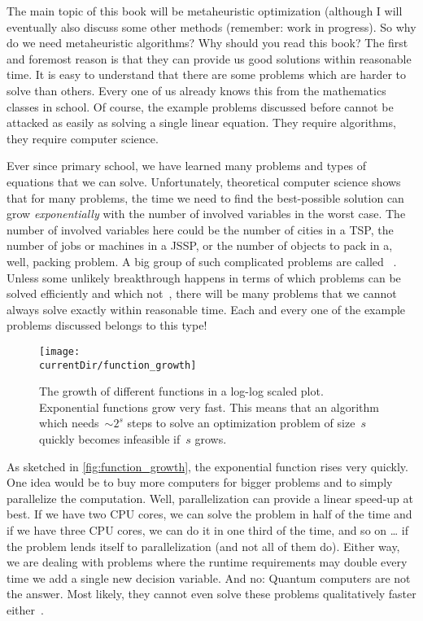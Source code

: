 %
%
The main topic of this book will be metaheuristic optimization (although I will eventually also discuss some other methods (remember: work in progress).
So why do we need metaheuristic algorithms?
Why should you read this book?%
%
%
\label{sec:approximationOfTheOptimum}%
%
The first and foremost reason is that they can provide us good solutions within reasonable time.
It is easy to understand that there are some problems which are harder to solve than others.
Every one of us already knows this from the mathematics classes in school.
Of course, the example problems discussed before cannot be attacked as easily as solving a single linear equation.
They require algorithms, they require computer science.

Ever since primary school, we have learned many problems and types of equations that we can solve.
Unfortunately, theoretical computer science shows that for many problems, the time we need to find the best-possible solution can grow \emph{exponentially} with the number of involved variables in the worst case.
The number of involved variables here could be the number of cities in a \gls{TSP}, the number of jobs or machines in a \gls{JSSP}, or the number of objects to pack in a, well, packing problem.
A big group of such complicated problems are called \NPhard~\cite{LLRKS1993SASAAC,CPW1998AROMSCAAA}.
Unless some unlikely breakthrough happens in terms of which problems can be solved efficiently and which not~\cite{C1971TCOTPP,K1972RACP}, there will be many problems that we cannot always solve exactly within reasonable time.
Each and every one of the example problems discussed belongs to this type!

\begin{figure}%
\centering%
\texttt{[image: \\currentDir/function\_growth]}%
\caption{The growth of different functions in a log-log scaled plot. Exponential functions grow very fast. This means that an algorithm which needs~$\sim 2^s$ steps to solve an optimization problem of size~$s$ quickly becomes infeasible if~$s$ grows.}%
\label{fig:function_growth}%
\end{figure}

As sketched in \autoref{fig:function_growth}, the exponential function rises very quickly.
One idea would be to buy more computers for bigger problems and to simply parallelize the computation.
Well, parallelization can provide a linear speed-up at best.
If we have two CPU cores, we can solve the problem in half of the time and if we have three CPU cores, we can do it in one third of the time, and so on {\dots} if the problem lends itself to parallelization (and not all of them do).
Either way, we are dealing with problems where the runtime requirements may double every time we add a single new decision variable.
And no: Quantum computers are not the answer.
Most likely, they cannot even solve these problems qualitatively faster either~\cite{A2008TLOQC}.


